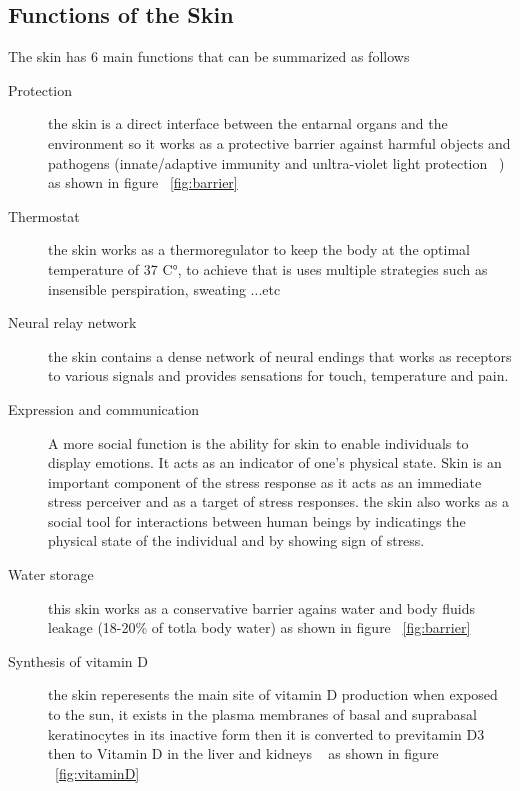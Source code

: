 \subsection{Functions of the Skin}
The skin has 6 main functions that can be summarized as follows~\cite{sarah2021}
\begin{description}
\item[Protection]
            the skin is a direct interface between the entarnal organs and the environment so it works as a protective barrier against harmful objects and pathogens (innate/adaptive immunity and unltra-violet light protection  ~\cite{joseph2020}) as shown in figure ~\ref{fig:barrier}
            
\item[Thermostat]
            the skin works as a thermoregulator to keep the body at the optimal temperature of 37 C°, to achieve that is uses multiple strategies such as insensible perspiration, sweating ...etc
\item[Neural relay network]
            the skin contains a dense network of neural endings that works as receptors to various signals and provides sensations for touch, temperature and pain.
\item[Expression and communication]
            A more social function
            is the ability for skin to enable individuals to display
            emotions. It acts as an indicator of one’s physical state.
            Skin is an important component of the stress response as it
            acts as an immediate stress perceiver and as a target of
            stress responses.
            the skin also works as a social tool for interactions between human beings by indicatings the physical state of the individual and by showing sign of stress.
\item[Water storage]
            this skin works as a conservative barrier agains water and body fluids leakage (18-20\% of totla body water) as shown in figure ~\ref{fig:barrier}
\item[Synthesis of vitamin D]
            the skin reperesents the main site of vitamin D production when exposed to the sun, it exists in the plasma membranes of basal and suprabasal keratinocytes in its inactive form then it is converted to previtamin D3 then to Vitamin D in the liver and kidneys  ~\cite{joseph2020} as shown in figure ~\ref{fig:vitaminD}
\end{description}
